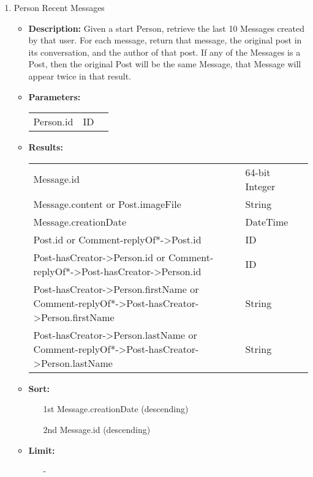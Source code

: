 {\begin{enumerate}
  \item Person Recent Messages
    \begin{itemize}
      \item \textbf{Description:}
        Given a start Person, retrieve the last 10 Messages created by that user.
        For each message, return that message, the original post in its conversation, and the author of that post.
        If any of the Messages is a Post, then the original Post will be the same Message, \ie that Message will appear twice in that result.
      \item \textbf{Parameters:} \\
        \begin{tabular}{lll}
          Person.id 										& ID \\
        \end{tabular}
      \item \textbf{Results:} \\
        \begin{tabular}{lll}
          Message.id     									& 64-bit Integer \\
          Message.content or Post.imageFile										& String \\
          Message.creationDate  & DateTime \\
          Post.id or Comment-replyOf*->Post.id								& ID \\
          Post-hasCreator->Person.id or Comment-replyOf*->Post-hasCreator->Person.id & ID \\
          Post-hasCreator->Person.firstName or Comment-replyOf*->Post-hasCreator->Person.firstName & String \\
          Post-hasCreator->Person.lastName or Comment-replyOf*->Post-hasCreator->Person.lastName & String \\
        \end{tabular}
      \item \textbf{Sort:}
        \begin{itemize}
          \item[1st] Message.creationDate (descending)
          \item[2nd] Message.id (descending)
        \end{itemize}
            \item \textbf{Limit:}
                  \begin{itemize}
                    \item[] -
                  \end{itemize}
    \end{itemize}


\end{enumerate}}
